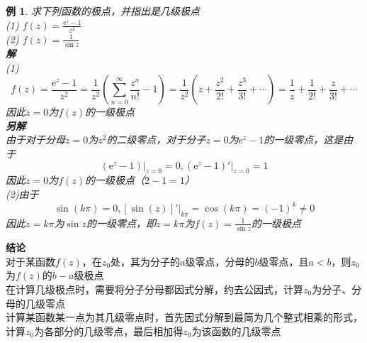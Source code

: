 \documentclass[12pt, a4paper, twoside]{ctexbook}
\newtheorem{example}[theorem]{例}
\begin{document}
\begin{example}
	求下列函数的极点，并指出是几级极点\\
	\hspace*{2em}(1) $f\left(z\right)=\frac{\mathrm{e}^z-1}{z^2}$\\
	\hspace*{2em}(2) $f\left(z\right)=\frac{1}{\sin z}$\\
	\hspace*{1em}\textbf{解}\\
	\hspace*{2em}(1)
	$$
	f\left(z\right)=\frac{\mathrm{e}^z-1}{z^2}=\frac{1}{z^2}\left(\sum_{n=0}^{\infty}\frac{z^n}{n!}-1\right)=\frac{1}{z^2}\left(z+\frac{z^2}{2!}+\frac{z^3}{3!}+\cdots\right)=\frac{1}{z}+\frac{1}{2!}+\frac{z}{3!}+\cdots
	$$
	\hspace*{2em}因此$z=0$为$f\left(z\right)$的一级极点\\
	\hspace*{1em}\textbf{另解}\\
	\hspace*{2em}由于对于分母$z=0$为$z^2$的二级零点，对于分子$z=0$为$\mathrm{e}^z-1$的一级零点，这是由于
	$$
	\left.\left(\mathrm{e}^z-1\right)\right|_{z=0}=0,\left.\left(\mathrm{e}^z-1\right)'\right|_{z=0}=1
	$$
	\hspace*{2em}因此$z=0$为$f\left(z\right)$的一级极点（$2-1=1$）\\
	\hspace*{2em}(2)由于
	$$
	\sin\left(k\pi\right)=0,\left.\left[\sin\left(z\right)\right]'\right|_{k\pi}=\cos \left(k\pi\right)=\left(-1\right)^k\neq 0
	$$
	\hspace*{2em}因此$z=k\pi$为$\sin z$的一级零点，即$z=k\pi$为$f\left(z\right)=\frac{1}{\sin z}$的一级极点
\end{example}
\textbf{结论}\\
	\hspace*{2em}对于某函数$f\left(z\right)$，在$z_0$处，其为分子的$a$级零点，分母的$b$级零点，且$a<b$，则$z_0$为$f\left(z\right)$的$b-a$级极点\\
	\hspace*{2em}在计算几级极点时，需要将分子分母都因式分解，约去公因式，计算$z_0$为分子、分母的几级零点\\
	\hspace*{2em}计算某函数某一点为其几级零点时，首先因式分解到最简为几个整式相乘的形式，计算$z_0$为各部分的几级零点，最后相加得$z_0$为该函数的几级零点
\end{document}
